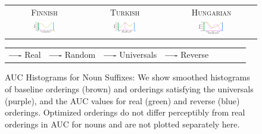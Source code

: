\documentclass[man]{apa7}
\begin{document}
\begin{figure}
\begin{center}
\begin{tabular}{ccc}
\textsc{Finnish} & \textsc{Turkish} & \textsc{Hungarian} \\
    \includegraphics[width=0.3\textwidth]{figures/finnish_nouns/suffixes-byMorphemes-auc-hist-heldout-Coarse-FineSurprisal-optimized.pdf}
    &
    \includegraphics[width=0.3\textwidth]{figures/turkish_nouns/suffixes-byMorphemes-auc-hist-heldout-Coarse-FineSurprisal-optimized.pdf}
    &
    \includegraphics[width=0.3\textwidth]{figures/hungarian_nouns/suffixes-byMorphemes-auc-hist-heldout-Coarse-FineSurprisal-optimized.pdf}
    \end{tabular}
    
    \begin{tabular}{llllllll}
\textbf{\textcolor{real}{----}} Real&
\textbf{\textcolor{random}{----}} Random&
\textbf{\textcolor{universals}{----}} Universals&
\textbf{\textcolor{reverse}{----}} Reverse
\end{tabular}
\end{center}
    
    \caption{AUC Histograms for Noun Suffixes: We show smoothed histograms of baseline orderings (brown) and orderings satisfying the universals (purple), and the AUC values for real (green) and reverse (blue) orderings. %
	Optimized orderings do not differ perceptibly from real orderings in AUC for nouns and are not plotted separately here.  }
    \label{fig:auc_nouns}
\end{figure}
\end{document}
